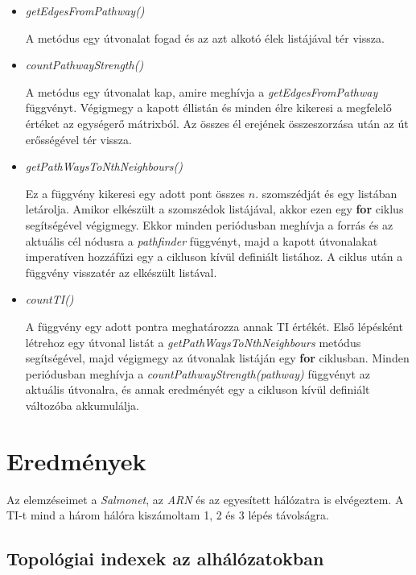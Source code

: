 \documentclass[a4paper,12pt]{article}
\begin{document}
\begin{itemize}
			\item \textit{getEdgesFromPathway()}
			
			A metódus egy útvonalat fogad és az azt alkotó élek listájával tér vissza. 
			
			\item \textit{countPathwayStrength()}
			
			A metódus egy útvonalat kap, amire meghívja a \textit{getEdgesFromPathway} függvényt. Végigmegy a kapott éllistán és minden élre kikeresi a megfelelő értéket az egységerő mátrixból. Az összes él erejének összeszorzása után az út erősségével tér vissza.
			
			\item \textit{getPathWaysToNthNeighbours()}
			
			Ez a függvény kikeresi egy adott pont összes $n$. szomszédját és egy listában letárolja. Amikor elkészült a szomszédok listájával, akkor ezen egy \textbf{for} ciklus segítségével végigmegy. Ekkor minden periódusban meghívja a forrás és az aktuális cél nódusra a \textit{pathfinder} függvényt, majd a kapott útvonalakat imperatíven hozzáfűzi egy a cikluson kívül definiált listához. A ciklus után a függvény visszatér az elkészült listával.
			
			\item \textit{countTI()}
			
			A függvény egy adott pontra meghatározza annak TI értékét. Első lépésként létrehoz egy útvonal listát a \textit{getPathWaysToNthNeighbours} metódus segítségével, majd végigmegy az útvonalak listáján egy \textbf{for} ciklusban. Minden periódusban meghívja a \textit{countPathwayStrength(pathway)} függvényt az aktuális útvonalra, és annak eredményét egy a cikluson kívül definiált változóba akkumulálja.
			
		\end{itemize}
		\pagebreak


\section{Eredmények}

	Az elemzéseimet a \textit{Salmonet}, az \textit{ARN} és az egyesített hálózatra is elvégeztem. A TI-t mind a három hálóra kiszámoltam 1, 2 és 3 lépés távolságra. 
	
	\subsection{Topológiai indexek az alhálózatokban}
\end{document}
